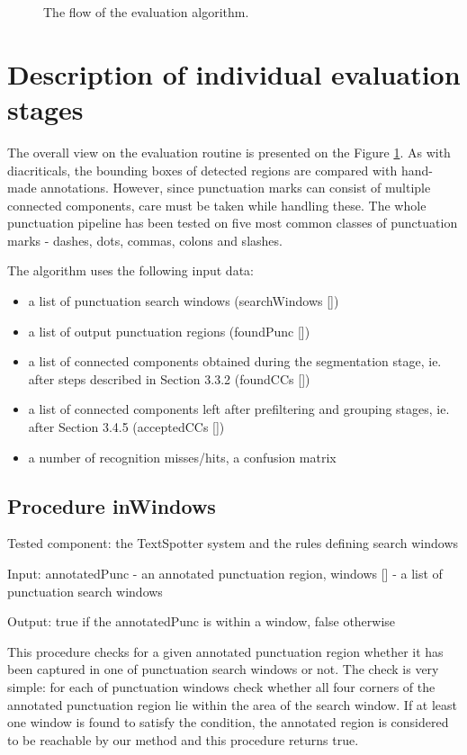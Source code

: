 \documentclass[12pt,a4paper]{report}
\begin{document}
\begin{figure}[htbp]
    \centering
    \caption{The flow of the evaluation algorithm.}
    \label{fig:punctuation-eval-flow}
\end{figure}

\section{Description of individual evaluation stages}
The overall view on the evaluation routine is presented on the Figure \ref{fig:punctuation-eval-flow}. As with diacriticals, the bounding boxes of detected regions are compared with hand- made annotations. However, since punctuation marks can consist of multiple connected components, care must be taken while handling these. The whole punctuation pipeline has been tested on five most common classes of punctuation marks - dashes, dots, commas, colons and slashes.

The algorithm uses the following input data:
\begin{itemize}
    \item a list of punctuation search windows (searchWindows [])
    \item a list of output punctuation regions (foundPunc [])
    \item a list of connected components obtained during the segmentation stage, ie. after steps described in Section 3.3.2 (foundCCs [])
    \item a list of connected components left after prefiltering and grouping stages, ie. after Section 3.4.5 (acceptedCCs [])
    \item a number of recognition misses/hits, a confusion matrix
\end{itemize}

\subsection{Procedure inWindows}
Tested component: the TextSpotter system and the rules defining search windows

Input: annotatedPunc - an annotated punctuation region, windows [] - a list of punctuation search windows

Output: true if the annotatedPunc is within a window, false otherwise

This procedure checks for a given annotated punctuation region whether it has been captured in one of punctuation search windows or not. The check is very simple: for each of punctuation windows check whether all four corners of the annotated punctuation region lie within the area of the search window. If at least one window is found to satisfy the condition, the annotated region is considered to be reachable by our method and this procedure returns true.
\end{document}
